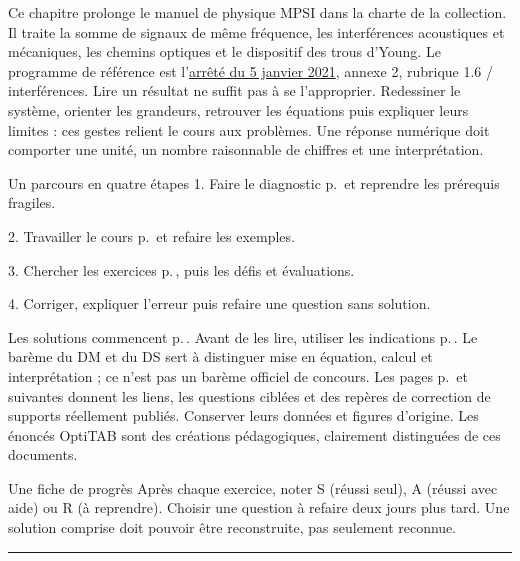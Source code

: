 \thispagestyle{mpsiFront}
Ce chapitre prolonge le manuel de physique MPSI dans la charte de la collection. Il traite la somme de signaux de même fréquence, les interférences acoustiques et mécaniques, les chemins optiques et le dispositif des trous d’Young. Le programme de référence est l’\href{https://www.education.gouv.fr/bo/21/Special1/ESRS2035779A.htm}{arrêté du 5 janvier 2021}, annexe 2, rubrique 1.6 / interférences.
Lire un résultat ne suffit pas à se l’approprier. Redessiner le système, orienter les grandeurs, retrouver les équations puis expliquer leurs limites : ces gestes relient le cours aux problèmes. Une réponse numérique doit comporter une unité, un nombre raisonnable de chiffres et une interprétation.
\begin{loi}{Un parcours en quatre étapes}
1. Faire le diagnostic p.\,\pageref{diagnostic} et reprendre les prérequis fragiles.\par
2. Travailler le cours p.\,\pageref{cours-1} et refaire les exemples.\par
3. Chercher les exercices p.\,\pageref{td1}, puis les défis et évaluations.\par
4. Corriger, expliquer l’erreur puis refaire une question sans solution.
\end{loi}
Les solutions commencent p.\,\pageref{corr-diag}. Avant de les lire, utiliser les indications p.\,\pageref{indices}. Le barème du DM et du DS sert à distinguer mise en équation, calcul et interprétation ; ce n’est pas un barème officiel de concours.
Les pages p.\,\pageref{sources-1} et suivantes donnent les liens, les questions ciblées et des repères de correction de supports réellement publiés. Conserver leurs données et figures d’origine. Les énoncés OptiTAB sont des créations pédagogiques, clairement distinguées de ces documents.
\begin{methode}{Une fiche de progrès}
Après chaque exercice, noter S (réussi seul), A (réussi avec aide) ou R (à reprendre). Choisir une question à refaire deux jours plus tard. Une solution comprise doit pouvoir être reconstruite, pas seulement reconnue.
\end{methode}


\thispagestyle{mpsiFront}
\begingroup\setlength{\parskip}{0pt}\fontsize{10}{13.5}\selectfont
{}

\endgroup
\vspace{2mm}\hrule\vspace{2mm}


